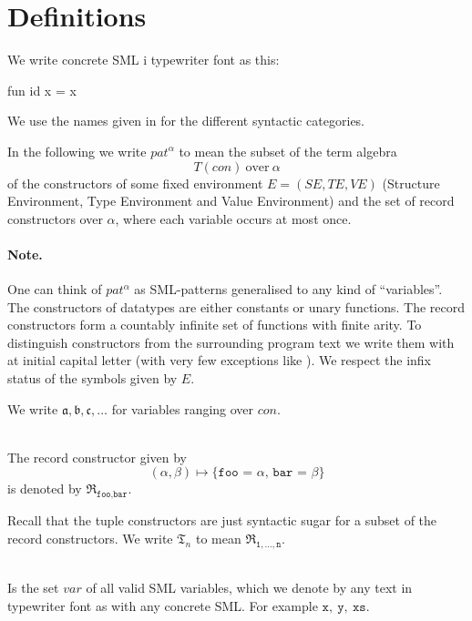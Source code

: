 \section{Definitions}
We write concrete SML i typewriter font as this:
\begin{code}
fun id x = x
\end{code}

We use the names given in \cite{SML97} for the different syntactic categories.

\begin{definition}
  In the following we write $pat^\alpha$ to mean the subset of the term algebra
  \[
  T(con)\ \text{over}\ \alpha
  \]
  of the constructors of some fixed environment $E = (S\!E, T\!E, V\!E)$
  (Structure Environment, Type Environment and Value Environment) and the set of
  record constructors over $\alpha$, where each variable occurs at most
  once. 

\end{definition}

\paragraph{Note.} One can think of $pat^\alpha$ as SML-patterns generalised to
any kind of ``variables''. The constructors of datatypes are either constants or
unary functions. The record constructors form a countably infinite set of
functions with finite arity. To distinguish constructors from the surrounding
program text we write them with at initial capital letter (with very few
exceptions like \codeinline{::} ). We respect the infix status
of the symbols given by $E$.

We write $\mathfrak{a}, \mathfrak{b}, \mathfrak{c}, \ldots$ for variables ranging
over $con$.

\begin{definition} \ \\
  The record constructor given by
  \[
  (\alpha, \beta) \mapsto \texttt{\{foo = $\alpha$, bar = $\beta$\}}
  \]
  is denoted by $\mathfrak{R}_{\texttt{foo},\texttt{bar}}$.

  Recall that the tuple constructors are just syntactic sugar for a subset of
  the record constructors. We write $\mathfrak{T}_n$ to mean
  $\mathfrak{R}_{\texttt{1},\ldots,\texttt{n}}$.
\end{definition}

\begin{definition} \ \\
  Is the set $var$ of all valid SML variables, which we denote by any text in
  typewriter font as with any concrete SML. For example $\mathtt{x},\
  \mathtt{y},\ \mathtt{xs}$.
\end{definition}

